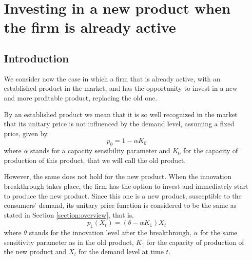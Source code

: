 
\chapter{Investing in a new product when the firm is already active}
\label{chapter:2}



\section{Introduction}
\label{section:2_intro}

We consider now the case in which a firm that is already active, with an established product in the market, and has the opportunity to invest in a new and more profitable product, replacing the old one.

By an established product we mean that it is so well recognized in the market that its unitary price is not influenced by the demand level, assuming a fixed price, given by
\begin{equation}
p_0=1-\alpha K_0
\label{p0}
\end{equation}
where $\alpha$ stands for a capacity sensibility parameter and $K_0$ for the capacity of production of this product, that we will call the old product.

However, the same does not hold for the new product. When the innovation breakthrough takes place, the firm has the option to invest and immediately start to produce the new product. Since this one is a new product, susceptible to the consumers' demand, its unitary price function is considered to be the same as stated in Section \ref{section:overview}, that is,
\begin{equation}
p_1(X_t)=(\theta-\alpha K_1)X_t
\label{p1}
\end{equation}
where $\theta$ stands for the innovation level after the breakthrough, $\alpha$ for the same sensitivity parameter as in the old product, $K_1$ for the capacity of production of the new product and $X_t$ for the demand level at time $t$.

